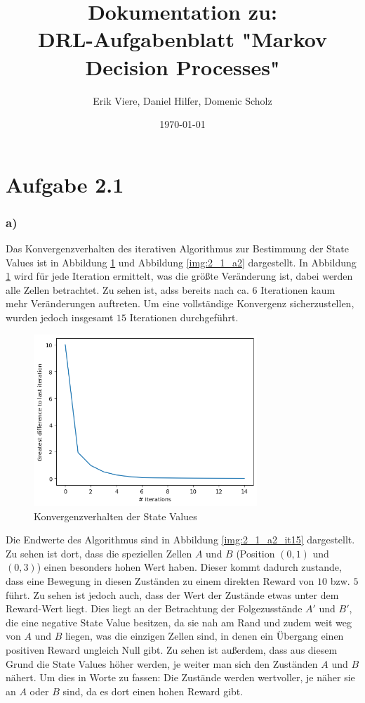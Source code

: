 \documentclass[11pt]{article}
\title{\textbf{Dokumentation zu:\\DRL-Aufgabenblatt "Markov Decision Processes"}}
\author{Erik Viere, Daniel Hilfer, Domenic Scholz}
\date{\today}
\begin{document}
\maketitle	
\pagebreak

\section*{Aufgabe 2.1}
\subsubsection*{a)}

Das Konvergenzverhalten des iterativen Algorithmus zur Bestimmung der State Values ist in Abbildung \ref{img:2_1_a1} und Abbildung \ref{img:2_1_a2} dargestellt. In Abbildung \ref{img:2_1_a1} wird für jede Iteration ermittelt, was die größte Veränderung ist, dabei werden alle Zellen betrachtet. Zu sehen ist, adss bereits nach ca. $6$ Iterationen kaum mehr Veränderungen auftreten. Um eine vollständige Konvergenz sicherzustellen, wurden jedoch insgesamt $15$ Iterationen durchgeführt.\\
\begin{figure}
    \centering
    \includegraphics[width=0.75\textwidth]{img/img_2_1_a1.png}
    \caption{Konvergenzverhalten der State Values}
    \label{img:2_1_a1}
\end{figure}
Die Endwerte des Algorithmus sind in Abbildung \ref{img:2_1_a2_it15} dargestellt. Zu sehen ist dort, dass die speziellen Zellen $A$ und $B$ (Position $(0,1)$ und $(0,3)$) einen besonders hohen Wert haben. Dieser kommt dadurch zustande, dass eine Bewegung in diesen Zuständen zu einem direkten Reward von $10$ bzw. $5$ führt. Zu sehen ist jedoch auch, dass der Wert der Zustände etwas unter dem Reward-Wert liegt. Dies liegt an der Betrachtung der Folgezusstände $A'$ und $B'$, die eine negative State Value besitzen, da sie nah am Rand und zudem weit weg von $A$ und $B$ liegen, was die einzigen Zellen sind, in denen ein Übergang einen positiven Reward ungleich Null gibt. Zu sehen ist außerdem, dass aus diesem Grund die State Values höher werden, je weiter man sich den Zuständen $A$ und $B$ nähert. Um dies in Worte zu fassen: Die Zustände werden wertvoller, je näher sie an $A$ oder $B$ sind, da es dort einen hohen Reward gibt.\\
\end{document}
